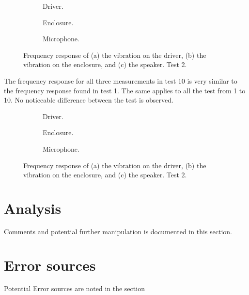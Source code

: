 \begin{figure}[H]
\centering
\begin{subfigure}[t]{0.37\textwidth}
	
	\caption{Driver.}
	\label{fig:FFT_driver10}
\end{subfigure}
\begin{subfigure}[t]{0.28\textwidth}
	
	\caption{Enclosure.}
	\label{fig:FFT_enclosure10}
\end{subfigure}
\begin{subfigure}[t]{0.32\textwidth}
	
	\caption{Microphone.}
	\label{fig:FFT_mic10}
\end{subfigure}
\caption{Frequency response of (a) the vibration on the driver, (b) the vibration on the enclosure, and (c) the speaker. Test 2.}
\label{fig:FFT1}
\end{figure}

The frequency response for all three measurements in test 10 is very similar to the frequency response found in test 1. The same applies to all the test from 1 to 10. No noticeable difference between the test is observed.

\begin{figure}[H]
\centering
\begin{subfigure}[t]{0.37\textwidth}
	
	\caption{Driver.}
	\label{fig:FFT_driver10}
\end{subfigure}
\begin{subfigure}[t]{0.28\textwidth}
	
	\caption{Enclosure.}
	\label{fig:FFT_enclosure19}
\end{subfigure}
\begin{subfigure}[t]{0.32\textwidth}
	
	\caption{Microphone.}
	\label{fig:FFT_mic19}
\end{subfigure}
\caption{Frequency response of (a) the vibration on the driver, (b) the vibration on the enclosure, and (c) the speaker. Test 2.}
\label{fig:FFT1}
\end{figure} 










\section{Analysis}

Comments and potential further manipulation is documented in this section. 

\section{Error sources}

Potential Error sources are noted in the section

